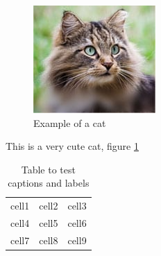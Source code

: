 \documentclass[12pt, a4paper]{article} %
\begin{document}
\begin{figure}[h]
  \centering
  \includegraphics[scale=0.5]{cat}  %
  \caption{Example of a cat}
  \label{fig:cat}
\end{figure}

This is a very cute cat, figure \ref{fig:cat}

\begin{table}
\begin{center}
\begin{tabular}{ |c|c|c| }
 \hline
 cell1 & cell2 & cell3 \\
 cell4 & cell5 & cell6 \\
 cell7 & cell8 & cell9 \\
 \hline
\end{tabular}
\end{center}
\caption{Table to test captions and labels}
\label{table:1}
\end{table}



\end{document}
